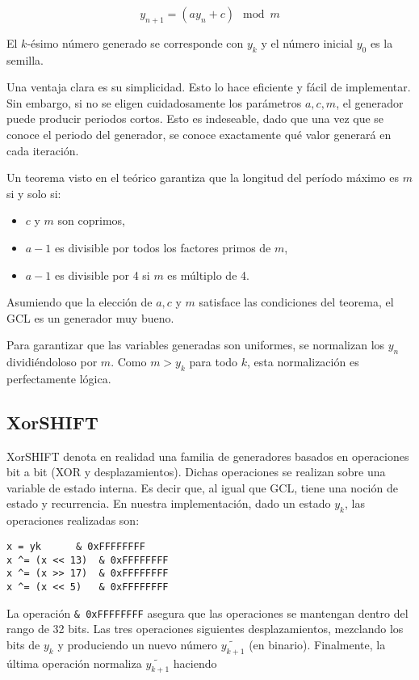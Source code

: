 \documentclass[a4paper, 12pt]{article}
\begin{document}
\begin{equation*}
y_{n+1} = (ay_n + c) \mod m
\end{equation*}

El $k$-ésimo número generado se corresponde con $y_k$ y el número inicial $y_0$
es la semilla.

Una ventaja clara es su simplicidad. Esto lo hace eficiente y fácil de
implementar. Sin embargo, si no se eligen cuidadosamente los parámetros $a, c,
m$, el generador puede producir periodos cortos. Esto es indeseable, dado que
una vez que se conoce el periodo del generador, se conoce exactamente qué valor
generará en cada iteración.

Un teorema visto en el teórico garantiza que la longitud del período máximo es
$m$ si y solo si:

\begin{itemize}
    \item $c$ y $m$ son coprimos,
    \item $a - 1$ es divisible por todos los factores primos de $m$,
    \item $a - 1$ es divisible por 4 si $m$ es múltiplo de 4.
\end{itemize}

Asumiendo que la elección de $a, c$ y $m$ satisface las condiciones del teorema,
el GCL es un generador muy bueno. 

Para garantizar que las variables generadas son uniformes, se normalizan los
$y_n$ dividiéndoloso por $m$. Como $m > y_k$ para todo $k$, esta normalización
es perfectamente lógica.

\subsection{XorSHIFT}

XorSHIFT denota en realidad una familia de generadores basados en operaciones
bit a bit (XOR y desplazamientos). Dichas operaciones se realizan sobre una
variable de estado interna. Es decir que, al igual que GCL, tiene una noción de
estado y recurrencia. En nuestra implementación, dado un estado $y_k$, las
operaciones realizadas son:

\begin{verbatim}
x = yk      & 0xFFFFFFFF
x ^= (x << 13)  & 0xFFFFFFFF
x ^= (x >> 17)  & 0xFFFFFFFF
x ^= (x << 5)   & 0xFFFFFFFF
\end{verbatim}

La operación \texttt{\& 0xFFFFFFFF} asegura que las operaciones se mantengan
dentro del rango de 32 bits. Las tres operaciones siguientes desplazamientos,
mezclando los bits de $y_k$ y produciendo un nuevo número $\widetilde{y_{k+1}}$ (en
binario). Finalmente, la última operación normaliza $\widetilde{y_{k+1}}$ haciendo 
\end{document}
